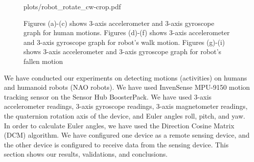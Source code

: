 \documentclass[letterpaper]{article}
\begin{document}
\begin{sloppy}
\begin{figure}[!t]
{{plots/robot_rotate_cw-crop.pdf}}
\\

\caption{Figures (a)-(c) shows 3-axis accelerometer and 3-axis gyroscope graph for human motions. Figures (d)-(f) shows 3-axis accelerometer and 3-axis gyroscope graph for robot's walk motion. Figures (g)-(i) shows 3-axis accelerometer and 3-axis gyroscope graph for robot's fallen motion}
 \label{fig:anotation-human-robot} 
\end{figure}


We have conducted our experiments on detecting motions (activities) on 
humans and humanoid robots (NAO robots). We have used InvenSense MPU-9150 
motion tracking sensor on the Sensor Hub BoosterPack. 
% 
% 
We have used 3-axis accelerometer readings, 3-axis gyroscope readings, 3-axis magnetometer readings, 
the quaternion rotation axis of the device, and Euler angles roll, pitch, and yaw.  In order to 
calculate Euler angles, we have used the Direction Cosine Matrix (DCM) algorithm. We have configured 
one device as a remote sensing device, and the other device is configured to receive data from the 
sensing device. This section shows our results, validations, and conclusions.



\end{sloppy}
\end{document}
